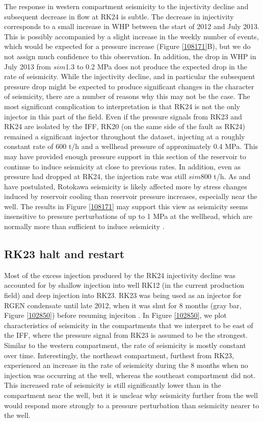 The response in western compartment seismicity to the injectivity decline and subsequent decrease in flow at RK24 is subtle. The decrease in injectivity corresponds to a small increase in WHP between the start of 2012 and July 2013. This is possibly accompanied by a slight increase in the weekly number of events, which would be expected for a pressure increase (Figure \ref{108171}B), but we do not assign much confidence to this observation. In addition, the drop in WHP in July 2013 from $sim${1.3} to 0.2 MPa does not produce the expected drop in the rate of seismicity. While the injectivity decline, and in particular the subsequent pressure drop might be expected to produce significant changes in the character of seismicity, there are a number of reasons why this may not be the case. The most significant complication to interpretation is that RK24 is not the only injector in this part of the field. Even if the pressure signals from RK23 and RK24 are isolated by the IFF, RK20 (on the same side of the fault as RK24) remained a significant injector throughout the dataset, injecting at a roughly constant rate of 600 t/h and a wellhead pressure of approximately 0.4 MPa. This may have provided enough pressure support in this section of the reservoir to continue to induce seismicity at close to previous rates. In addition, even as pressure had dropped at RK24, the injection rate was still $sim$800 t/h. As \citet{Sherburn_2015} and \citet{Sewell_2015WGC} have postulated, Rotokawa seismicity is likely affected more by stress changes induced by reservoir cooling than reservoir pressure increases, especially near the well. The results in Figure \ref{108171} may support this view as seismicity seems insensitive to pressure perturbations of up to 1 MPa at the wellhead, which are normally more than sufficient to induce seismicity \citep{keranen2018induced,stein1999role}.

\subsection{RK23 halt and restart}
Most of the excess injection produced by the RK24 injectivity decline was accounted for by shallow injection into well RK12 (in the current production field) and deep injection into RK23. RK23 was being used as an injector for RGEN condensate until late 2012, when it was shut for 8 months (gray bar, Figure \ref{102850}) before resuming injeciton \citep{Addison_2017stanford}. In Figure \ref{102850}, we plot characteristics of seismicity in the compartments that we interpret to be east of the IFF, where the pressure signal from RK23 is assumed to be the strongest. Similar to the western compartment, the rate of seismicity is mostly constant over time. Interestingly, the northeast compartment, furthest from RK23, experienced an increase in the rate of seismicity during the 8 months when no injection was occurring at the well, whereas the southeast compartment did not. This increased rate of seismicity is still significantly lower than in the compartment near the well, but it is unclear why seismicity further from the well would respond more strongly to a pressure perturbation than seismicity nearer to the well.

